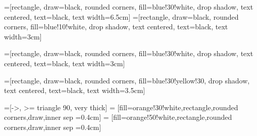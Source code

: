 
=[rectangle, draw=black, rounded corners, fill=blue!30!white, drop shadow,
text centered, text=black, text width=6.5cm]
=[rectangle, draw=black, rounded corners, fill=blue!10!white, drop shadow,
text centered, text=black, text width=3cm]

=[rectangle, draw=black, rounded corners, fill=blue!30!white, drop shadow,
text centered, text=black, text width=3cm]

=[rectangle, draw=black, rounded corners, fill=blue!30!yellow!30, drop shadow,
text centered, text=black, text width=3.5cm]

=[->, >= triangle 90, very thick]
 = [fill=orange!30!white,rectangle,rounded corners,draw,inner sep =0.4cm]
 = [fill=orange!50!white,rectangle,rounded corners,draw,inner sep =0.4cm]


